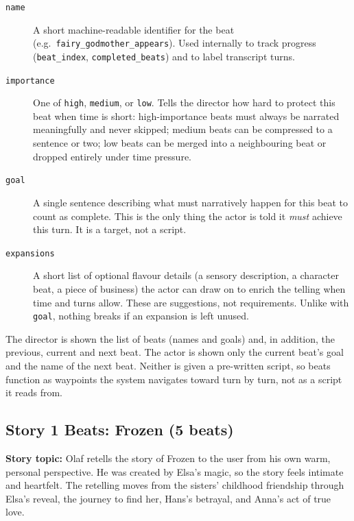 \begin{description}
\item[\texttt{name}] A short machine-readable identifier for the beat (e.g.\
\texttt{fairy\_godmother\_appears}). Used internally to track progress
(\texttt{beat\_index}, \texttt{completed\_beats}) and to label transcript
turns.
\item[\texttt{importance}] One of \texttt{high}, \texttt{medium}, or
\texttt{low}. Tells the director how hard to protect this beat when time is
short: high-importance beats must always be narrated meaningfully and never
skipped; medium beats can be compressed to a sentence or two; low beats can
be merged into a neighbouring beat or dropped entirely under time pressure.
\item[\texttt{goal}] A single sentence describing what must narratively
happen for this beat to count as complete. This is the only thing the actor
is told it \emph{must} achieve this turn. It is a target, not a script.
\item[\texttt{expansions}] A short list of optional flavour details (a
sensory description, a character beat, a piece of business) the actor can
draw on to enrich the telling when time and turns allow. These are
suggestions, not requirements. Unlike with \texttt{goal}, nothing breaks if an
expansion is left unused.
\end{description}

The director is shown the list of beats (names and goals) and, in addition,
the previous, current and next beat. The actor is shown only the current
beat's goal and the name of the next beat. Neither is given a pre-written
script, so beats function as waypoints the system navigates toward turn by
turn, not as a script it reads from.

\subsection{Story 1 Beats: Frozen (5 beats)}
\label{app:beats-frozen}

\textbf{Story topic:} Olaf retells the story of Frozen to the user from his
own warm, personal perspective. He was created by Elsa's magic, so the story
feels intimate and heartfelt. The retelling moves from the sisters'
childhood friendship through Elsa's reveal, the journey to find her, Hans's
betrayal, and Anna's act of true love.

